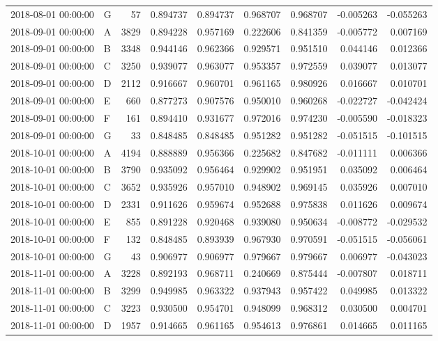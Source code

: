\begin{tabular}{llrrrrrrr}
2018-08-01 00:00:00 & G & 57 & 0.894737 & 0.894737 & 0.968707 & 0.968707 & -0.005263 & -0.055263 \\
2018-09-01 00:00:00 & A & 3829 & 0.894228 & 0.957169 & 0.222606 & 0.841359 & -0.005772 & 0.007169 \\
2018-09-01 00:00:00 & B & 3348 & 0.944146 & 0.962366 & 0.929571 & 0.951510 & 0.044146 & 0.012366 \\
2018-09-01 00:00:00 & C & 3250 & 0.939077 & 0.963077 & 0.953357 & 0.972559 & 0.039077 & 0.013077 \\
2018-09-01 00:00:00 & D & 2112 & 0.916667 & 0.960701 & 0.961165 & 0.980926 & 0.016667 & 0.010701 \\
2018-09-01 00:00:00 & E & 660 & 0.877273 & 0.907576 & 0.950010 & 0.960268 & -0.022727 & -0.042424 \\
2018-09-01 00:00:00 & F & 161 & 0.894410 & 0.931677 & 0.972016 & 0.974230 & -0.005590 & -0.018323 \\
2018-09-01 00:00:00 & G & 33 & 0.848485 & 0.848485 & 0.951282 & 0.951282 & -0.051515 & -0.101515 \\
2018-10-01 00:00:00 & A & 4194 & 0.888889 & 0.956366 & 0.225682 & 0.847682 & -0.011111 & 0.006366 \\
2018-10-01 00:00:00 & B & 3790 & 0.935092 & 0.956464 & 0.929902 & 0.951951 & 0.035092 & 0.006464 \\
2018-10-01 00:00:00 & C & 3652 & 0.935926 & 0.957010 & 0.948902 & 0.969145 & 0.035926 & 0.007010 \\
2018-10-01 00:00:00 & D & 2331 & 0.911626 & 0.959674 & 0.952688 & 0.975838 & 0.011626 & 0.009674 \\
2018-10-01 00:00:00 & E & 855 & 0.891228 & 0.920468 & 0.939080 & 0.950634 & -0.008772 & -0.029532 \\
2018-10-01 00:00:00 & F & 132 & 0.848485 & 0.893939 & 0.967930 & 0.970591 & -0.051515 & -0.056061 \\
2018-10-01 00:00:00 & G & 43 & 0.906977 & 0.906977 & 0.979667 & 0.979667 & 0.006977 & -0.043023 \\
2018-11-01 00:00:00 & A & 3228 & 0.892193 & 0.968711 & 0.240669 & 0.875444 & -0.007807 & 0.018711 \\
2018-11-01 00:00:00 & B & 3299 & 0.949985 & 0.963322 & 0.937943 & 0.957422 & 0.049985 & 0.013322 \\
2018-11-01 00:00:00 & C & 3223 & 0.930500 & 0.954701 & 0.948099 & 0.968312 & 0.030500 & 0.004701 \\
2018-11-01 00:00:00 & D & 1957 & 0.914665 & 0.961165 & 0.954613 & 0.976861 & 0.014665 & 0.011165 \\

\end{tabular}
